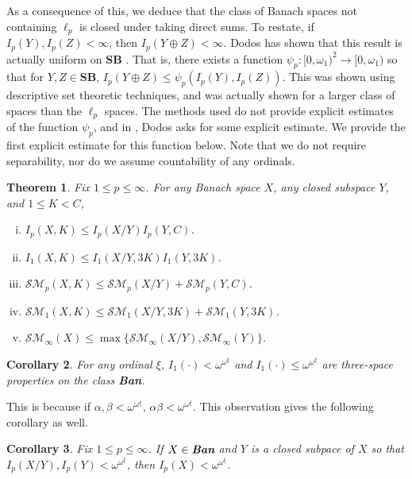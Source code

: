 \documentclass[12pt]{amsart}
\newtheorem{theorem}{Theorem}[section]
\newtheorem{corollary}[theorem]{Corollary}
\theoremstyle{definition}
\newcommand{\ssm}{\mathcal{SM}}
\begin{document}
As a consequence of this, we deduce that the class of Banach spaces not containing $\ell_p$ is closed under taking direct sums.  To restate, if $I_p(Y), I_p(Z)<\infty$, then $I_p(Y\oplus Z)<\infty$.  Dodos has shown that this result is actually uniform on $\textbf{SB}$ \cite{D}.  That is, there exists a function $\psi_p:[0, \omega_1)^2\to [0, \omega_1)$ so that for $Y,Z\in \textbf{SB}$, $I_p(Y\oplus Z)\leqslant \psi_p(I_p(Y), I_p(Z))$.  This was shown using descriptive set theoretic techniques, and was actually shown for a larger class of spaces than the $\ell_p$ spaces.  The methods used do not provide explicit estimates of the function $\psi_p$, and in \cite{D}, Dodos asks for some explicit estimate.  We provide the first explicit estimate for this function below.  Note that we do not require separability, nor do we assume countability of any ordinals.  



\begin{theorem} Fix $1\leqslant p\leqslant \infty$.  For any Banach space $X$, any closed subspace $Y$, and $1\leqslant K<C$, \begin{enumerate}[(i)]\item $I_p(X, K)\leqslant I_p(X/Y) I_p(Y, C)$. \item $I_1(X, K)\leqslant I_1(X/Y, 3K)I_1(Y, 3K)$. \item $\ssm_p(X, K)\leqslant \ssm_p(X/Y)+\ssm_p(Y, C)$. \item $\ssm_1(X, K)\leqslant \ssm_1(X/Y, 3K)+\ssm_1(Y, 3K)$. \item $\ssm_\infty(X)\leqslant \max\{\ssm_\infty(X/Y), \ssm_\infty(Y)\}$. \end{enumerate}

\label{three space}

\end{theorem}


\begin{corollary} For any ordinal $\xi$, $I_1(\cdot)<\omega^{\omega^\xi}$ and $I_1(\cdot)\leqslant \omega^{\omega^\xi}$ are three-space properties on the class \emph{\textbf{Ban}}.   \end{corollary}

This is because if $\alpha ,\beta<\omega^{\omega^\xi}$, $\alpha\beta<\omega^{\omega^\xi}$.  This observation gives the following corollary as well.  

\begin{corollary} Fix $1\leqslant p\leqslant \infty$.  If $X\in\emph{\textbf{Ban}}$ and $Y$ is a closed subpace of $X$ so that $I_p(X/Y), I_p(Y)<\omega^{\omega^\xi}$, then $I_p(X)< \omega^{\omega^\xi}$.  

\end{corollary}
\end{document}
